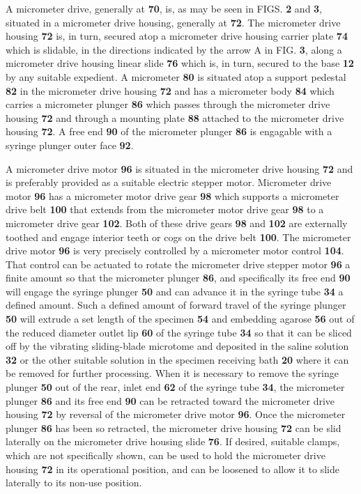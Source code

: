 \documentclass{article}
\begin{document}
A micrometer drive, generally at \textbf{70}, is, as may be seen in FIGS. \textbf{2} and \textbf{3}, situated in a micrometer drive housing, generally at \textbf{72}. The micrometer drive housing \textbf{72} is, in turn, secured atop a micrometer drive housing carrier plate \textbf{74} which is slidable, in the directions indicated by the arrow A in FIG. \textbf{3}, along a micrometer drive housing linear slide \textbf{76} which is, in turn, secured to the base \textbf{12} by any suitable expedient. A micrometer \textbf{80} is situated atop a support pedestal \textbf{82} in the micrometer drive housing \textbf{72} and has a micrometer body \textbf{84} which carries a micrometer plunger \textbf{86} which passes through the micrometer drive housing \textbf{72} and through a mounting plate \textbf{88} attached to the micrometer drive housing \textbf{72}. A free end \textbf{90} of the micrometer plunger \textbf{86} is engagable with a syringe plunger outer face \textbf{92}.

A micrometer drive motor \textbf{96} is situated in the micrometer drive housing \textbf{72} and is preferably provided as a suitable electric stepper motor. Micrometer drive motor \textbf{96} has a micrometer motor drive gear \textbf{98} which supports a micrometer drive belt \textbf{100} that extends from the micrometer motor drive gear \textbf{98} to a micrometer drive gear \textbf{102}. Both of these drive gears \textbf{98} and \textbf{102} are externally toothed and engage interior teeth or cogs on the drive belt \textbf{100}. The micrometer drive motor \textbf{96} is very precisely controlled by a micrometer motor control \textbf{104}. That control can be actuated to rotate the micrometer drive stepper motor \textbf{96} a finite amount so that the micrometer plunger \textbf{86}, and specifically its free end \textbf{90} will engage the syringe plunger \textbf{50} and can advance it in the syringe tube \textbf{34} a defined amount. Such a defined amount of forward travel of the syringe plunger \textbf{50} will extrude a set length of the specimen \textbf{54} and embedding agarose \textbf{56} out of the reduced diameter outlet lip \textbf{60} of the syringe tube \textbf{34} so that it can be sliced off by the vibrating sliding-blade microtome and deposited in the saline solution \textbf{32} or the other suitable solution in the specimen receiving bath \textbf{20} where it can be removed for further processing. When it is necessary to remove the syringe plunger \textbf{50} out of the rear, inlet end \textbf{62} of the syringe tube \textbf{34}, the micrometer plunger \textbf{86} and its free end \textbf{90} can be retracted toward the micrometer drive housing \textbf{72} by reversal of the micrometer drive motor \textbf{96}. Once the micrometer plunger \textbf{86} has been so retracted, the micrometer drive housing \textbf{72} can be slid laterally on the micrometer drive housing slide \textbf{76}. If desired, suitable clamps, which are not specifically shown, can be used to hold the micrometer drive housing \textbf{72} in its operational position, and can be loosened to allow it to slide laterally to its non-use position.
\end{document}
